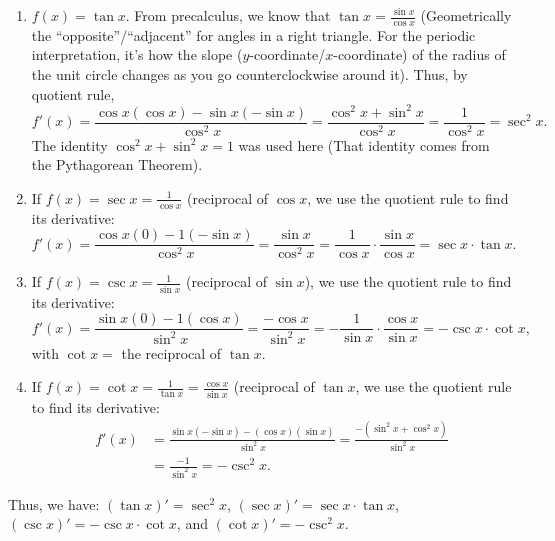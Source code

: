 \documentclass{ximera}
\begin{document}
\begin{enumerate}[label=\arabic*.]
    \item $f(x) = \tan x$.  From precalculus, we know that $\tan x = \frac{\sin x }{\cos x}$  (Geometrically the ``opposite''/``adjacent'' for angles in a right triangle.  For the periodic interpretation, it's how the slope ($y$-coordinate/$x$-coordinate) of the radius of the unit circle changes as you go counterclockwise around it).  Thus, by quotient rule, 
    \[
    f'(x) = \frac{\cos x(\cos x) - \sin x(-\sin x)}{\cos^2 x} = \frac{\cos^2 x + \sin^2 x}{\cos^2 x} = \frac{1}{\cos^2 x} = \sec^2 x.
    \]
    The identity $\cos^2 x + \sin^2 x = 1$ was used here (That identity comes from the Pythagorean Theorem).
    \item If $f(x) = \sec x = \frac{1}{\cos x}$ (reciprocal of $\cos x$, we use the quotient rule to find its derivative:
    \[
    f'(x) = \frac{\cos x (0) - 1(-\sin x)}{\cos^2 x} = \frac{\sin x}{\cos^2 x} = \frac{1}{\cos x} \cdot \frac{\sin x}{\cos x} = \sec x \cdot \tan x.
    \]
    \item If $f(x) = \csc x = \frac{1}{\sin x}$ (reciprocal of $\sin x$),  we use the quotient rule to find its derivative:
    \[
    f'(x) = \frac{\sin x (0) - 1(\cos x)}{\sin^2 x} = \frac{-\cos x}{\sin^2 x} = -\frac{1}{\sin x} \cdot \frac{\cos x}{\sin x} = -\csc x \cdot \cot x,
    \]
    with $\cot x =$ the reciprocal of $\tan x$.
    \item If $f(x) = \cot x = \frac{1}{\tan x} = \frac{\cos x}{\sin x}$ (reciprocal of $\tan x$, we use the quotient rule to find its derivative:
    \begin{align*}
    f'(x) &= \frac{\sin x (-\sin x) - (\cos x)(\sin x)}{\sin^2 x} = \frac{-(\sin^2 x + \cos^2 x)}{\sin^2 x} \\
    &= \frac{-1}{\sin^2 x} = -\csc^2 x.
    \end{align*}
\end{enumerate}

Thus, we have:   $(\tan x)' = \sec^2 x$,  $(\sec x)' = \sec x \cdot \tan x$,  $(\csc x)' = -\csc x \cdot \cot x$, and $(\cot x)' = -\csc^2 x$. 


 
\end{document}
